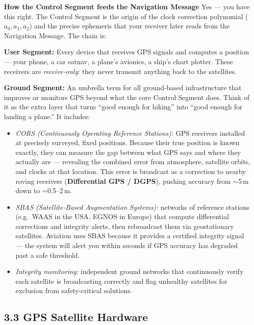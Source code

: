 \documentclass[12pt, a4paper]{article}
\begin{document}
\begin{notebox}
  \textbf{How the Control Segment feeds the Navigation Message}
  Yes --- you have this right.
  The Control Segment is the origin of the clock correction polynomial
  ($a_0, a_1, a_2$) and the precise ephemeris that your receiver later reads
  from the Navigation Message.
  The chain is:
\end{notebox}

\textbf{User Segment:} Every device that receives GPS signals and computes a
position --- your phone, a car satnav, a plane's avionics, a ship's chart
plotter.
These receivers are \emph{receive-only}: they never transmit anything back
to the satellites.

\textbf{Ground Segment:} An umbrella term for all ground-based infrastructure
that improves or monitors GPS beyond what the core Control Segment does.
Think of it as the extra layer that turns ``good enough for hiking'' into
``good enough for landing a plane.''
It includes:
\begin{itemize}[leftmargin=1.2em, itemsep=2pt]
  \item \emph{CORS (Continuously Operating Reference Stations):} GPS receivers
    installed at precisely surveyed, fixed positions.
    Because their true position is known exactly, they can measure the gap
    between what GPS says and where they actually are --- revealing the
    combined error from atmosphere, satellite orbits, and clocks at that
    location.
    This error is broadcast as a correction to nearby roving receivers
    (\textbf{Differential GPS / DGPS}), pushing accuracy from
    $\sim$5\,m down to $\sim$0.5--2\,m.
  \item \emph{SBAS (Satellite-Based Augmentation Systems):} networks of
    reference stations (e.g.\ WAAS in the USA, EGNOS in Europe) that compute
    differential corrections and integrity alerts, then rebroadcast them via
    geostationary satellites.
    Aviation uses SBAS because it provides a certified integrity signal ---
    the system will alert you within seconds if GPS accuracy has degraded
    past a safe threshold.
  \item \emph{Integrity monitoring:} independent ground networks that
    continuously verify each satellite is broadcasting correctly and flag
    unhealthy satellites for exclusion from safety-critical solutions.
\end{itemize}

\subsection*{3.3 \quad GPS Satellite Hardware}
\end{document}
